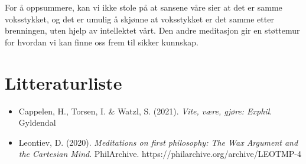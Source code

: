 \documentclass[11pt, a4paper]{article}
\begin{document}
For å oppsummere, kan vi ikke stole på at sansene våre sier at det er samme voksstykket, og det er umulig å skjønne at voksstykket er det samme etter brenningen, uten hjelp av intellektet vårt. Den andre meditasjon gir en støttemur for hvordan vi kan finne oss frem til sikker kunnskap. 




\section{Litteraturliste}

\begin{itemize}
    \item Cappelen, H., Torsen, I. \& Watzl, S. (2021). \textit{Vite, være, gjøre: Exphil}. Gyldendal
    \item Leontiev, D. (2020). \textit{Meditations on first philosophy: The Wax Argument and the Cartesian Mind}. PhilArchive. https://philarchive.org/archive/LEOTMP-4 
\end{itemize}
\end{document}
